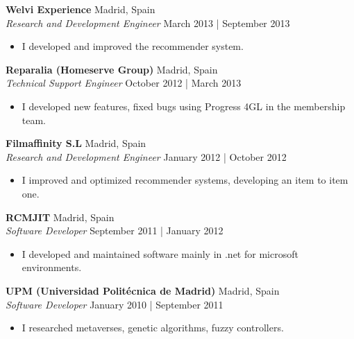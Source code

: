 \documentclass[a4paper]{article}
\begin{document}
\textbf{Welvi Experience} \hfill Madrid, Spain\\
\textit{Research and Development Engineer} \hfill March 2013 | September 2013\\
\vspace{-1mm}
\begin{itemize} \itemsep 1pt
	\item I developed and improved the recommender system.
\end{itemize}

\textbf{Reparalia (Homeserve Group)} \hfill Madrid, Spain\\
\textit{Technical Support Engineer} \hfill October 2012 | March 2013\\
\vspace{-1mm}
\begin{itemize} \itemsep 1pt
	\item I developed new features, fixed bugs using Progress 4GL in the membership team.
\end{itemize}

\textbf{Filmaffinity S.L} \hfill Madrid, Spain\\
\textit{Research and Development Engineer} \hfill January 2012 | October 2012\\
\vspace{-1mm}
\begin{itemize} \itemsep 1pt
	\item I improved and optimized recommender systems, developing an item to item one.
\end{itemize}

\textbf{RCMJIT} \hfill Madrid, Spain\\
\textit{Software Developer} \hfill September 2011 | January 2012\\
\vspace{-1mm}
\begin{itemize} \itemsep 1pt
	\item I developed and maintained software mainly in .net for microsoft environments.
\end{itemize}

\textbf{UPM (Universidad Politécnica de Madrid)} \hfill Madrid, Spain\\
\textit{Software Developer} \hfill January 2010 | September 2011\\
\vspace{-1mm}
\begin{itemize} \itemsep 1pt
	\item I researched metaverses, genetic algorithms, fuzzy controllers.
\end{itemize}
\end{document}
